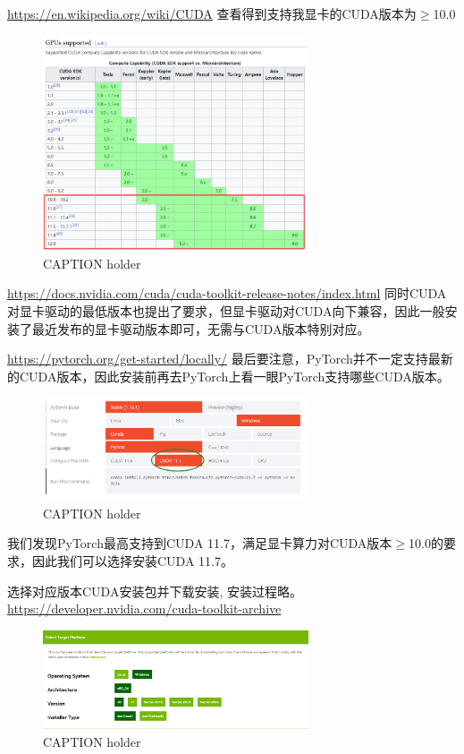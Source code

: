 \url{https://en.wikipedia.org/wiki/CUDA}
查看得到支持我显卡的CUDA版本为$\geq$10.0
\begin{figure}[htbp]
    \centering
    \includegraphics[width=0.7\textwidth]{figures/corresponding-cuda-version.png}
    \caption{CAPTION holder}
    \label{LABEL holder}
\end{figure}

\url{https://docs.nvidia.com/cuda/cuda-toolkit-release-notes/index.html}
同时CUDA对显卡驱动的最低版本也提出了要求，但显卡驱动对CUDA向下兼容，因此一般安装了最近发布的显卡驱动版本即可，无需与CUDA版本特别对应。


\url{https://pytorch.org/get-started/locally/}
最后要注意，PyTorch并不一定支持最新的CUDA版本，因此安装前再去PyTorch上看一眼PyTorch支持哪些CUDA版本。
\begin{figure}[htbp]
    \centering
    \includegraphics[width=0.7\textwidth]{figures/cuda-version-constrained-by-pytorch.png}
    \caption{CAPTION holder}
    \label{LABEL holder}
\end{figure}

我们发现PyTorch最高支持到CUDA 11.7，满足显卡算力对CUDA版本$\geq$10.0的要求，因此我们可以选择安装CUDA 11.7。

选择对应版本CUDA安装包并下载安装, 安装过程略。
\url{https://developer.nvidia.com/cuda-toolkit-archive}

\begin{figure}[htbp]
	\centering
	\includegraphics[width=0.7\textwidth]{figures/select-cuda-version.png}
	\caption{CAPTION holder}
	\label{LABEL holder}
\end{figure}

